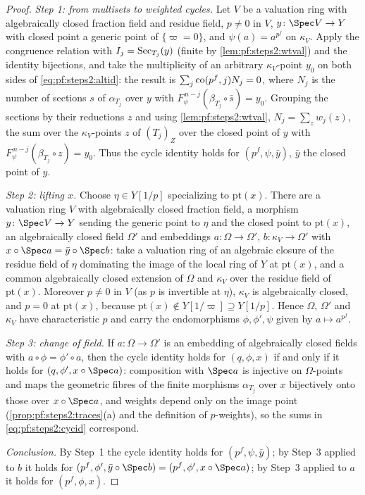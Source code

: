 \begin{proof}
\emph{Step 1: from multisets to weighted cycles.} Let $V$ be a valuation ring with algebraically
closed fraction field and residue field, $p\ne0$ in $V$, $y\colon\Spec V\to Y$ with closed point a
generic point of $\{\varpi=0\}$, and $\psi(a)=a^{p^f}$ on $\kappa_V$. Apply the congruence relation
with $I_j=\mathrm{Sec}_{T_j}(y)$ (finite by \cref{lem:pf:steps2:wtval}) and the identity bijections,
and take the multiplicity of an arbitrary $\kappa_V$-point $y_0$ on both sides of
\eqref{eq:pf:steps2:altid}: the result is $\sum_j\mathrm{co}(p^f,j)N_j=0$, where $N_j$ is the number of
sections $s$ of $\alpha_{T_j}$ over $y$ with $F_\psi^{\,n-j}(\beta_{T_j}\circ\bar s)=y_0$. Grouping the
sections by their reductions $z$ and using \cref{lem:pf:steps2:wtval}, $N_j=\sum_zw_j(z)$, the sum
over the $\kappa_V$-points $z$ of $(T_j)_Z$ over the closed point of $y$ with
$F_\psi^{\,n-j}(\beta_{T_j}\circ z)=y_0$. Thus the cycle identity holds for $(p^f,\psi,\bar y)$, $\bar
y$ the closed point of $y$.

\emph{Step 2: lifting $x$.} Choose $\eta\in Y[1/p]$ specializing to $\mathrm{pt}(x)$. There are a
valuation ring $V$ with algebraically closed fraction field, a morphism $y\colon\Spec V\to Y$ sending
the generic point to $\eta$ and the closed point to $\mathrm{pt}(x)$, an algebraically closed field
$\Omega'$ and embeddings $a\colon\Omega\to\Omega'$, $b\colon\kappa_V\to\Omega'$ with $x\circ\Spec a=\bar
y\circ\Spec b$: take a valuation ring of an algebraic closure of the residue field of $\eta$
dominating the image of the local ring of $Y$ at $\mathrm{pt}(x)$, and a common algebraically closed
extension of $\Omega$ and $\kappa_V$ over the residue field of $\mathrm{pt}(x)$. Moreover $p\ne0$ in
$V$ (as $p$ is invertible at $\eta$), $\kappa_V$ is algebraically closed, and $p=0$ at
$\mathrm{pt}(x)$, because $\mathrm{pt}(x)\notin Y[1/\varpi]\supseteq Y[1/p]$. Hence $\Omega$,
$\Omega'$ and $\kappa_V$ have characteristic $p$ and carry the endomorphisms $\phi,\phi',\psi$ given by
$a\mapsto a^{p^f}$.

\emph{Step 3: change of field.} If $a\colon\Omega\to\Omega'$ is an embedding of algebraically closed
fields with $a\circ\phi=\phi'\circ a$, then the cycle identity holds for $(q,\phi,x)$ if and only if it
holds for $(q,\phi',x\circ\Spec a)$: composition with $\Spec a$ is injective on $\Omega$-points and
maps the geometric fibres of the finite morphisms $\alpha_{T_j}$ over $x$ bijectively onto those over
$x\circ\Spec a$, and weights depend only on the image point (\cref{prop:pf:steps2:traces}(a) and the
definition of $p$-weights), so the sums in \eqref{eq:pf:steps2:cycid} correspond.

\emph{Conclusion.} By Step~1 the cycle identity holds for $(p^f,\psi,\bar y)$; by Step~3 applied to
$b$ it holds for $(p^f,\phi',\bar y\circ\Spec b)=(p^f,\phi',x\circ\Spec a)$; by Step~3 applied to $a$ it
holds for $(p^f,\phi,x)$.
\end{proof}

